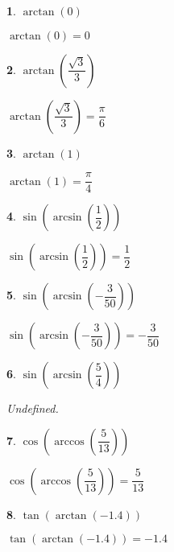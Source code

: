 \documentclass{amsbook}
\newtheorem{exc}{}
\newenvironment{ex}{\begin{exc}\normalfont}{\end{exc}}
\numberwithin{section}{chapter}
\numberwithin{equation}{chapter}
\begin{document}
\begin{multicols}{2}
 
\begin{ex}
	 $\arctan \left( 0 \right) $
	\begin{sol}
		 $\arctan \left( 0 \right) = 0$ 
	\end{sol}
\end{ex}

\begin{ex}
		$\arctan \left( \dfrac{\sqrt{3}}{3} \right)$
	\begin{sol}
		$\arctan \left( \dfrac{\sqrt{3}}{3} \right) = \dfrac{\pi}{6}$
	\end{sol}
\end{ex}
 
\begin{ex}
		$\arctan \left( 1 \right)$
	\begin{sol}
		$\arctan \left( 1 \right) = \dfrac{\pi}{4}$
	\end{sol}
\end{ex}

 \begin{ex}
	  $\sin\left(\arcsin\left(\dfrac{1}{2}\right)\right)$
	\begin{sol}
		  $\sin\left(\arcsin\left(\dfrac{1}{2}\right)\right) = \dfrac{1}{2}$ 
	\end{sol}
\end{ex}


\begin{ex}
	 $\sin\left(\arcsin\left(-\dfrac{3}{50}\right)\right)$
	\begin{sol}
		 $\sin\left(\arcsin\left(-\dfrac{3}{50}\right)\right) = -\dfrac{3}{50}$
	\end{sol}
\end{ex}

\begin{ex}
	$\sin\left(\arcsin\left(\dfrac{5}{4}\right)\right)$ 
	\begin{sol}
		Undefined.
	\end{sol}
\end{ex}
 \begin{ex}
	 $\cos\left(\arccos\left(\dfrac{5}{13}\right)\right)$
	\begin{sol}
		 $\cos\left(\arccos\left(\dfrac{5}{13}\right)\right) = \dfrac{5}{13}$
	\end{sol}
\end{ex}


\begin{ex}
	$\tan\left(\arctan\left(-1.4\right)\right)$
	\begin{sol}
			$\tan\left(\arctan\left(-1.4\right)\right) = -1.4$
	\end{sol}
\end{ex}


\end{multicols}
\end{document}
